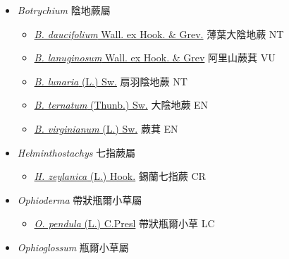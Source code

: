 
  \begin{itemize}
 \item[    ] \textit{Botrychium} 陰地蕨屬
                                
  \begin{itemize}
        \item[] \href{http://www.theplantlist.org/tpl1.1/search?q=Botrychium+daucifolium}{\textit{B. daucifolium} Wall. ex Hook. \& Grev.}   薄葉大陰地蕨   NT
        \item[] \href{http://www.theplantlist.org/tpl1.1/search?q=Botrychium+lanuginosum}{\textit{B. lanuginosum} Wall. ex Hook. \& Grev}   阿里山蕨萁   VU
        \item[] \href{http://www.theplantlist.org/tpl1.1/search?q=Botrychium+lunaria}{\textit{B. lunaria} (L.) Sw.}   扇羽陰地蕨   NT
        \item[] \href{http://www.theplantlist.org/tpl1.1/search?q=Botrychium+ternatum}{\textit{B. ternatum} (Thunb.) Sw.}   大陰地蕨   EN
        \item[] \href{http://www.theplantlist.org/tpl1.1/search?q=Botrychium+virginianum}{\textit{B. virginianum} (L.) Sw.}   蕨萁   EN
  \end{itemize}
 \item[    ] \textit{Helminthostachys} 七指蕨屬
                                
  \begin{itemize}
        \item[] \href{http://www.theplantlist.org/tpl1.1/search?q=Helminthostachys+zeylanica}{\textit{H. zeylanica} (L.) Hook.}   錫蘭七指蕨   CR
  \end{itemize}
 \item[    ] \textit{Ophioderma} 帶狀瓶爾小草屬
                                
  \begin{itemize}
        \item[] \href{http://www.theplantlist.org/tpl1.1/search?q=Ophioderma+pendula}{\textit{O. pendula} (L.) C.Presl}   帶狀瓶爾小草   LC
  \end{itemize}
 \item[    ] \textit{Ophioglossum} 瓶爾小草屬
                                

\end{itemize}
